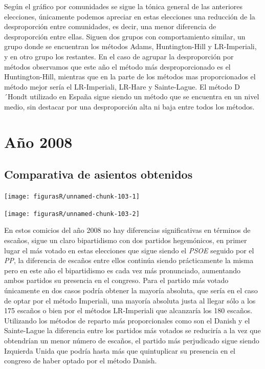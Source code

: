 \documentclass[12pt,a4paper,]{book}
\numberwithin{dummy}{section}
\theoremstyle{ocrenumbox}
\theoremstyle{blacknumex}
\theoremstyle{blacknumbox}
\theoremstyle{ocrenum}
\theoremstyle{ocrenum}
\begin{document}
Según el gráfico por comunidades se sigue la tónica general de las
anteriores elecciones, únicamente podemos apreciar en estas elecciones
una reducción de la desproporción entre comunidades, es decir, una menor
diferencia de desproporción entre ellas. Siguen dos grupos con
comportamiento similar, un grupo donde se encuentran los métodos Adams,
Huntington-Hill y LR-Imperiali, y en otro grupo los restantes. En el
caso de agrupar la desproporción por métodos observamos que este año el
método más desproporcionado es el Huntington-Hill, mientras que en la
parte de los métodos mas proporcionados el método mejor sería el
LR-Imperiali, LR-Hare y Sainte-Lague. El método D´Hondt utilizado en
España sigue siendo un método que se encuentra en un nivel medio, sin
destacar por una desproporción alta ni baja entre todos los métodos.

\hypertarget{auxf1o-2008}{%
\section{Año 2008}\label{auxf1o-2008}}

\hypertarget{comparativa-de-asientos-obtenidos-9}{%
\subsection{Comparativa de asientos
obtenidos}\label{comparativa-de-asientos-obtenidos-9}}

\begin{center}\texttt{[image: figurasR/unnamed-chunk-103-1]} \end{center}

\begin{center}\texttt{[image: figurasR/unnamed-chunk-103-2]} \end{center}

En estos comicios del año 2008 no hay diferencias significativas en
términos de escaños, sigue un claro bipartidismo con dos partidos
hegemónicos, en primer lugar el más votado en estas elecciones que sigue
siendo el \emph{PSOE} seguido por el \emph{PP}, la diferencia de escaños
entre ellos continúa siendo prácticamente la misma pero en este año el
bipartidismo es cada vez más pronunciado, aumentando ambos partidos su
presencia en el congreso. Para el partido más votado únicamente en dos
casos podría obtener la mayoría absoluta, que sería en el caso de optar
por el método Imperiali, una mayoría absoluta justa al llegar sólo a los
175 escaños o bien por el métodos LR-Imperiali que alcanzaría los 180
escaños. Utilizando los métodos de reparto más proporcionales como son
el Danish y el Sainte-Lague la diferencia entre los partidos más votados
se reduciría a la vez que obtendrían un menor número de escaños, el
partido más perjudicado sigue siendo Izquierda Unida que podría hasta
más que quintuplicar su presencia en el congreso de haber optado por el
método Danish.
\end{document}
